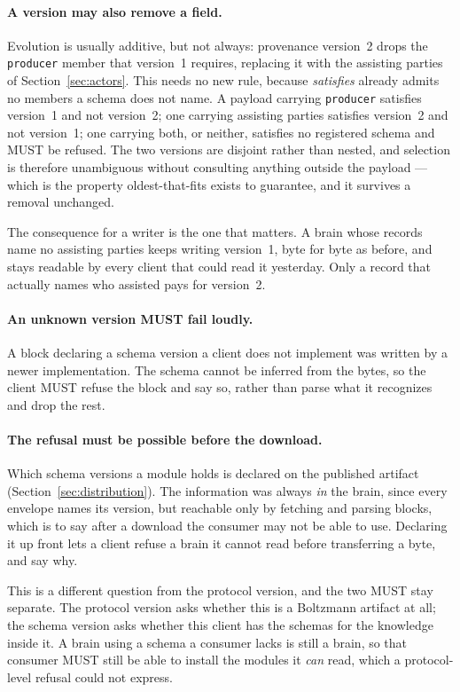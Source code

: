 \documentclass[11pt,a4paper]{article}
\begin{document}
\paragraph{A version may also remove a field.}
Evolution is usually additive, but not always: provenance version~2 drops the
\texttt{producer} member that version~1 requires, replacing it with the
assisting parties of Section~\ref{sec:actors}. This needs no new rule, because
\emph{satisfies} already admits no members a schema does not name. A payload
carrying \texttt{producer} satisfies version~1 and not version~2; one carrying
assisting parties satisfies version~2 and not version~1; one carrying both, or
neither, satisfies no registered schema and MUST be refused. The two versions
are disjoint rather than nested, and selection is therefore unambiguous without
consulting anything outside the payload --- which is the property
oldest-that-fits exists to guarantee, and it survives a removal unchanged.

The consequence for a writer is the one that matters. A brain whose records name
no assisting parties keeps writing version~1, byte for byte as before, and stays
readable by every client that could read it yesterday. Only a record that
actually names who assisted pays for version~2.

\paragraph{An unknown version MUST fail loudly.}
A block declaring a schema version a client does not implement was written by a
newer implementation. The schema cannot be inferred from the bytes, so the
client MUST refuse the block and say so, rather than parse what it recognizes
and drop the rest.

\paragraph{The refusal must be possible before the download.}
Which schema versions a module holds is declared on the published artifact
(Section~\ref{sec:distribution}). The information was always \emph{in} the brain, since every envelope names its
version, but reachable only by fetching and parsing blocks, which is to say
after a download the consumer may not be able to use. Declaring it up front lets a client refuse a brain it cannot read
before transferring a byte, and say why.

This is a different question from the protocol version, and the two MUST stay
separate. The protocol version asks whether this is a Boltzmann artifact at all;
the schema version asks whether this client has the schemas for the knowledge
inside it. A brain using a schema a consumer lacks is still a brain, so that
consumer MUST still be able to install the modules it \emph{can} read, which a
protocol-level refusal could not express.
\end{document}
